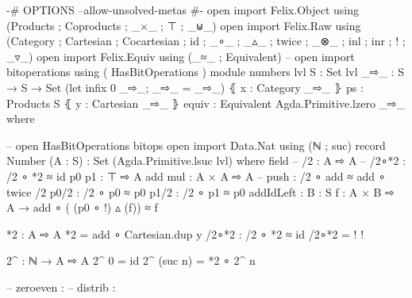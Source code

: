 

\begin{code}

{-# OPTIONS --allow-unsolved-metas #-}
open import Felix.Object using (Products ;  Coproducts ;   _×_ ; ⊤ ; _⊎_)
open import Felix.Raw using (Category ; Cartesian ; Cocartesian ; id ; _∘_ ; _▵_ ; twice ; _⊗_ ; inl ; inr ; ! ; _▿_)
open import Felix.Equiv using (_≈_ ; Equivalent)
-- open import bitoperations using ( HasBitOperations )
module numbers {lvl} {S : Set lvl} {_⇨_ : S  → S  → Set} (let infix 0 _⇨_; _⇨_ = _⇨_) ⦃ x : Category _⇨_ ⦄ {{ps : Products S}} ⦃ y : Cartesian _⇨_ ⦄{{ equiv : Equivalent Agda.Primitive.lzero _⇨_ }} where




-- open HasBitOperations bitops
open import Data.Nat using (ℕ ; suc)
record Number (A : S) : Set (Agda.Primitive.lsuc lvl) where
  field
    -- %
    /2 : A ⇨ A
    -- /2∘*2 : /2 ∘ *2 ≈ id
    p0 p1 : ⊤ ⇨ A
    add mul : A × A ⇨ A
    -- push : /2 ∘ add ≈ add ∘ twice /2
    p0/2 : /2 ∘ p0 ≈ p0
    p1/2 : /2 ∘ p1 ≈ p0
    addIdLeft : {B : S} {f : A × B ⇨ A} →  add ∘ ( (p0 ∘ !) ▵ (f)) ≈ f


  *2 : A ⇨ A
  *2 = add ∘ Cartesian.dup y
  /2∘*2 : /2 ∘ *2 ≈ id
  /2∘*2 = {! !}

  2^ : ℕ → A ⇨ A
  2^ 0  = id
  2^ (suc n) = *2 ∘ 2^ n

    -- zeroeven : %
    -- distrib : %

\end{code}
